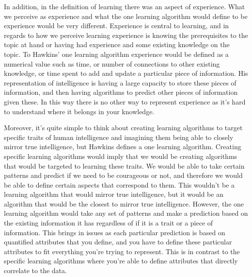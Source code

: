 \documentclass[11pt, oneside]{article}
\begin{document}

\par In addition, in the definition of learning there was an aspect of experience. What we perceive as experience and what the one learning algorithm would define to be experience would be very different. Experience is central to learning, and in regards to how we perceive learning experience is knowing the prerequisites to the topic at hand or having had experience and some existing knowledge on the topic. To Hawkins' one learning algorithm experience would be defined as a numerical value such as time, or number of connections to other existing knowledge, or time spent to add and update a particular piece of information. His representation of intelligence is having a large capacity to store these pieces of information, and then having algorithms to predict other pieces of information given these. In this way there is no other way to represent experience as it's hard to understand where it belongs in your knowledge.

\par Moreover, it's quite simple to think about creating learning algorithms to target specific traits of human intelligence and imagining them being able to closely mirror true intelligence, but Hawkins defines a one learning algorithm. Creating specific learning algorithms would imply that we would be creating algorithms that would be targeted to learning these traits. We would be able to take certain patterns and predict if we need to be courageous or not, and therefore we would be able to define certain aspects that correspond to them. This wouldn't be a learning algorithm that would mirror true intelligence, but it would be an algorithm that would be the closest to mirror true intelligence. However, the one learning algorithm would take any set of patterns and make a prediction based on the existing information it has regardless of if it is a trait or a piece of information. This brings in issues as each particular prediction is based on quantified attributes that you define, and you have to define these particular attributes to fit everything you're trying to represent. This is in contrast to the specific learning algorithms where you're able to define attributes that directly correlate to the data.
\end{document}
